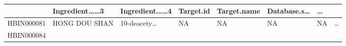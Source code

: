 \documentclass[
]{article}
\begin{document}
\begin{longtable}[]{@{}llllllll@{}}
\begin{minipage}[b]{0.11\columnwidth}
\end{minipage} & \begin{minipage}[b]{0.14\columnwidth}\raggedright
Ingredient\ldots\ldots3\strut
\end{minipage} & \begin{minipage}[b]{0.14\columnwidth}\raggedright
Ingredient\ldots\ldots4\strut
\end{minipage} & \begin{minipage}[b]{0.08\columnwidth}\raggedright
Target.id\strut
\end{minipage} & \begin{minipage}[b]{0.09\columnwidth}\raggedright
Target.name\strut
\end{minipage} & \begin{minipage}[b]{0.11\columnwidth}\raggedright
Database.s\ldots{}\strut
\end{minipage} & \begin{minipage}[b]{0.03\columnwidth}\raggedright
\ldots{}\strut
\end{minipage}\tabularnewline
\midrule
\endhead
\begin{minipage}[t]{0.11\columnwidth}\raggedright
HBIN000081\strut
\end{minipage} & \begin{minipage}[t]{0.11\columnwidth}\raggedright
HONG DOU SHAN\strut
\end{minipage} & \begin{minipage}[t]{0.14\columnwidth}\raggedright
10-deacety\ldots{}\strut
\end{minipage} & \begin{minipage}[t]{0.14\columnwidth}\raggedright
NA\strut
\end{minipage} & \begin{minipage}[t]{0.08\columnwidth}\raggedright
NA\strut
\end{minipage} & \begin{minipage}[t]{0.09\columnwidth}\raggedright
NA\strut
\end{minipage} & \begin{minipage}[t]{0.11\columnwidth}\raggedright
NA\strut
\end{minipage} & \begin{minipage}[t]{0.03\columnwidth}\raggedright
\ldots{}\strut
\end{minipage}\tabularnewline
\begin{minipage}[t]{0.11\columnwidth}\raggedright
HBIN000084\strut
\end{minipage} & \begin{minipage}[t]{0.11\columnwidth}\raggedright

\end{minipage}
\end{longtable}
\end{document}
